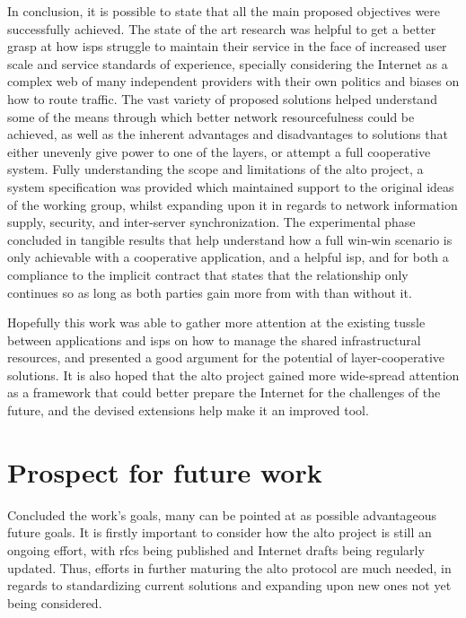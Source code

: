     In conclusion, it is possible to state that all the main proposed objectives were successfully achieved.
    The state of the art research was helpful to get a better grasp at how \glspl{isp} struggle to maintain their service in the face of increased user scale and service standards of experience, specially considering the Internet as a complex web of many independent providers with their own politics and biases on how to route traffic.
    The vast variety of proposed solutions helped understand some of the means through which better network resourcefulness could be achieved, as well as the inherent advantages and disadvantages to solutions that either unevenly give power to one of the layers, or attempt a full cooperative system.
    Fully understanding the scope and limitations of the \gls{alto} project, a system specification was provided which maintained support to the original ideas of the working group, whilst expanding upon it in regards to network information supply, security, and inter-server synchronization.
    The experimental phase concluded in tangible results that help understand how a full win-win scenario is only achievable with a cooperative application, and a helpful \gls{isp}, and for both a compliance to the implicit contract that states that the relationship only continues so as long as both parties gain more from with than without it.

    Hopefully this work was able to gather more attention at the existing tussle between applications and \glspl{isp} on how to manage the shared infrastructural resources, and presented a good argument for the potential of layer-cooperative solutions.
    It is also hoped that the \gls{alto} project gained more wide-spread attention as a framework that could better prepare the Internet for the challenges of the future, and the devised extensions help make it an improved tool.

\section{Prospect for future work}

    Concluded the work's goals, many can be pointed at as possible advantageous future goals.
    It is firstly important to consider how the \gls{alto} project is still an ongoing effort, with \glspl{rfc} being published and Internet drafts being regularly updated.
    Thus, efforts in further maturing the \gls{alto} protocol are much needed, in regards to standardizing current solutions and expanding upon new ones not yet being considered.

